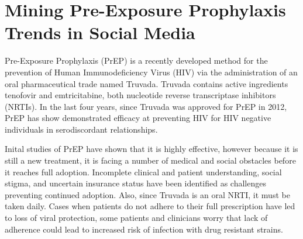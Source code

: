 


%



\section{Mining Pre-Exposure Prophylaxis Trends in Social Media}

Pre-Exposure Prophylaxis (PrEP) is a recently developed method for the prevention of Human Immunodeficiency Virus (HIV) via the administration of an oral pharmaceutical trade named Truvada. Truvada contains active ingredients tenofovir and emtricitabine, both nucleotide reverse transcriptase inhibitors (NRTIs). In the last four years, since Truvada was approved for PrEP in 2012, PrEP has show demonstrated efficacy at preventing HIV for HIV negative individuals in serodiscordant relationships\cite{liu2014early}.

Inital studies of PrEP have shown that it is highly effective\cite{golub2013efficacy}, however because it is still a new treatment, it is facing a number of medical and social obstacles before it reaches full adoption. Incomplete clinical and patient understanding, social stigma, and uncertain insurance status have been identified as challenges preventing continued adoption\cite{calabrese2015stigma}. Also, since Truvada is an oral NRTI, it must be taken daily. Cases when patients do not adhere to their full prescription have led to loss of viral protection, some patients and clinicians worry that lack of adherence could lead to increased risk of infection with drug resistant strains\cite{arnold2012qualitative}.

